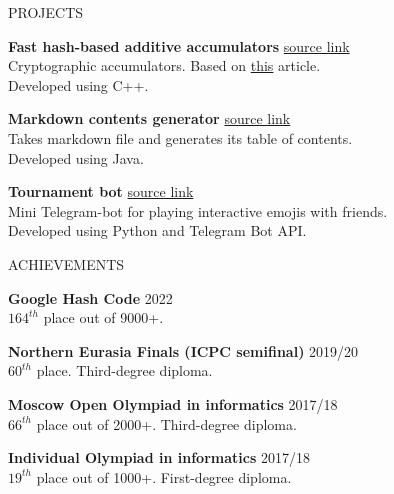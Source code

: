 \documentclass{resume} %
\begin{document}

\begin{rSection}{PROJECTS}
\vspace{-1.25em}
\item 
\textbf{Fast hash-based additive accumulators} \hfill \href{https://github.com/Darui99/AdditiveAccumulator}{source link}\\
Cryptographic accumulators. Based on \href{https://github.com/bigspider/accumulator/blob/master/docs/paper-draft.pdf}{this} article. \\ Developed using C++.
 
\item 
\textbf{Markdown contents generator} \hfill \href{https://github.com/Darui99/markdown-contents-generator}{source link}\\
Takes markdown file and generates its table of contents. \\ Developed using Java.

\item 
\textbf{Tournament bot} \hfill \href{https://github.com/Darui99/telegram-game-bot}{source link}\\
Mini Telegram-bot for playing interactive emojis with friends. \\ Developed using Python and Telegram Bot API.
 
\end{rSection} 


\begin{rSection}{ACHIEVEMENTS} 

{\bf Google Hash Code } \hfill {2022}\\
$164^{th}$ place out of 9000+.

{\bf Northern Eurasia Finals (ICPC semifinal)} \hfill {2019/20}\\
$60^{th}$ place. Third-degree diploma.

{\bf Moscow Open Olympiad in informatics} \hfill {2017/18}\\
$66^{th}$ place out of 2000+. Third-degree diploma.

{\bf Individual Olympiad in informatics} \hfill {2017/18}\\
$19^{th}$ place out of 1000+. First-degree diploma.


\end{rSection}
\end{document}
